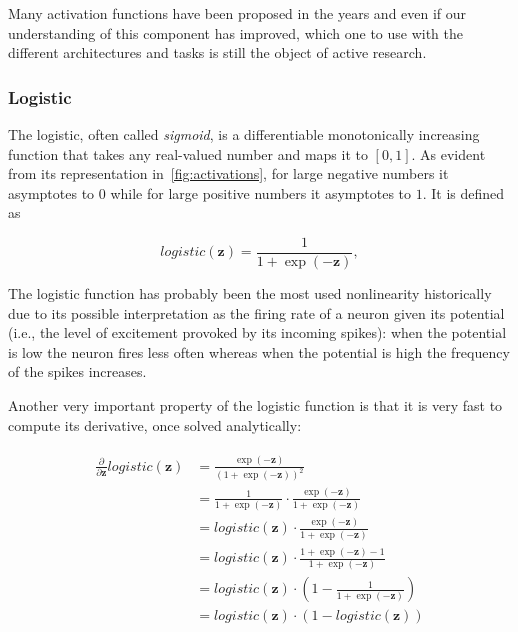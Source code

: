 Many activation functions have been proposed in the years and even if our
understanding of this component has improved, which one to use with the
different architectures and tasks is still the object of active research.

\subsubsection{Logistic}\label{sec:logistic}
The logistic, often called \emph{sigmoid}, is a differentiable monotonically
increasing function that takes any real-valued number and maps it to $[0, 1]$.
As evident from its representation in~\autoref{fig:activations}, for large
negative numbers it asymptotes to $0$ while for large positive numbers it
asymptotes to $1$. It is defined as

\begin{equation}\label{eq:logistic}
    logistic(\mathbf{z}) = \frac{1}{1+\exp(-\mathbf{z})},
\end{equation}

\noindent The logistic function has probably been the most used nonlinearity
historically due to its possible interpretation as the firing rate of a neuron
given its potential (i.e., the level of excitement provoked by its incoming
spikes): when the potential is low the neuron fires less often whereas when the
potential is high the frequency of the spikes increases.

Another very important property of the logistic function is that it is very
fast to compute its derivative, once solved analytically:

\begin{align}\label{eq:logistic_derivative}
\begin{split}%
    \frac{\partial}{\partial \mathbf{z}}logistic(\mathbf{z}) &=
        \frac{\exp(\mathbf{-z})}{\left(1+\exp(-\mathbf{z})\right)^2} \\
    &= \frac{1}{1+\exp(-\mathbf{z})} \cdot
        \frac{\exp(-\mathbf{z})}{1+\exp(-\mathbf{z})} \\
    &= logistic(\mathbf{z}) \cdot
        \frac{\exp(-\mathbf{z})}{1+\exp(-\mathbf{z})} \\
    &= logistic(\mathbf{z}) \cdot
        \frac{1+\exp(-\mathbf{z})-1}{1+\exp(-\mathbf{z})} \\
    &= logistic(\mathbf{z}) \cdot
        \left(1-\frac{1}{1+\exp(-\mathbf{z})}\right) \\
    &= logistic(\mathbf{z}) \cdot (1-logistic(\mathbf{z}))
\end{split}
\end{align}

